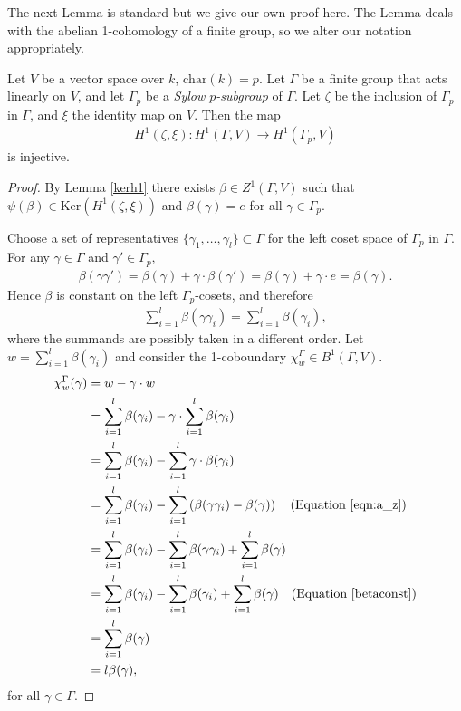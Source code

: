 The next Lemma is standard \cite[Theorem 10.3]{brown1976cohomology} but we give our own proof here. The Lemma deals with the abelian 1-cohomology of a finite group, so we alter our notation appropriately.

\begin{lemma} \label{brown}
Let $V$ be a vector space over $k$, $\mathrm{char}(k) = p$. Let $\Gamma$ be a finite group that acts linearly on $V$, and let $\Gamma_p$ be a \emph{Sylow $p$-subgroup} of $\Gamma$. Let $\zeta$ be the inclusion of $\Gamma_p$ in $\Gamma$, and $\xi$ the identity map on $V$. Then the map 
\begin{align*}
H^1(\zeta, \xi):H^1(\Gamma, V)\rightarrow H^1(\Gamma_p, V)
\end{align*}
is injective.
\end{lemma}
\begin{proof}
	By Lemma \ref{kerh1} there exists $\beta \in Z^1(\Gamma, V)$ such that $\psi(\beta) \in \mathrm{Ker}\left(H^1(\zeta, \xi)\right)$ and $\beta(\gamma) = e$ for all $\gamma \in \Gamma_p$.
	
	Choose a set of representatives $\{\gamma_1, \ldots, \gamma_l\} \subset \Gamma$ for the left coset space of $\Gamma_p$ in $\Gamma$.
	For any $\gamma \in \Gamma$ and $\gamma' \in \Gamma_p$,
\begin{align*}
	\beta(\gamma \gamma') = \beta(\gamma) + \gamma \cdot \beta(\gamma') = \beta(\gamma) +\gamma \cdot e = \beta(\gamma).
\end{align*} 
Hence $\beta$ is constant on the left $\Gamma_p$-cosets, and therefore
\begin{align}\label{betaconst}
	\sum_{i = 1}^l \beta(\gamma\gamma_i) = \sum_{i = 1}^l \beta(\gamma_i),
\end{align}
where the summands are possibly taken in a different order. 
Let $w = \sum_{i=1}^l \beta(\gamma_i)$ and consider the 1-coboundary $\chi^\Gamma_w \in B^1(\Gamma, V)$.
\begin{align*}
	\chi_{w}^\Gamma(\gamma) &=  w - \gamma\cdot w \\
	&=  \sum_{i = 1}^l\beta(\gamma_i) - \gamma\cdot \sum_{i = 1}^l\beta(\gamma_i) \\
	&=  \sum_{i = 1}^l\beta(\gamma_i) - \sum_{i = 1}^l\gamma \cdot \beta(\gamma_i) \\
	&=  \sum_{i = 1}^l\beta(\gamma_i) - \sum_{i = 1}^l\left(\beta(\gamma\gamma_i) - \beta(\gamma)\right) \quad(\textrm{Equation }\ref{eqn:a_z})\\
	&=  \sum_{i = 1}^l\beta(\gamma_i) - \sum_{i = 1}^l \beta(\gamma\gamma_i) +\sum_{i = 1}^l \beta(\gamma) \\
	&=  \sum_{i = 1}^l\beta(\gamma_i) - \sum_{i = 1}^l \beta(\gamma_i) +\sum_{i = 1}^l \beta(\gamma) \quad(\textrm{Equation }\ref{betaconst})\\
	&=  \sum_{i = 1}^l \beta(\gamma) \\
	&= l\beta(\gamma),
\end{align*}
for all $\gamma \in \Gamma$.


\end{proof}
